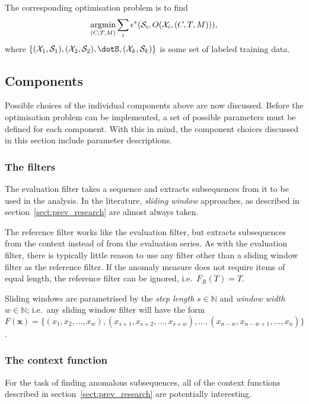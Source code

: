 The corresponding optimisation problem is to find
\[
    \argmin_{(C, T, M)} \sum_i \epsilon^*(\mathcal{S}_i, O(\mathcal{X}_i, (C, T, M))),
\]
where $\{(\mathcal{X}_1, \mathcal{S}_1), (\mathcal{X}_2, \mathcal{S}_2), \dotS, (\mathcal{X}_k, \mathcal{S}_k)\}$ is some set of labeled training data.

\subsection{Components}
\label{sect:components}

Possible choices of the individual components above are now discussed. Before the optimisation problem can be implemented, a set of possible parameters must be defined for each component. With this in mind, the component choices discussed in this section include parameter descriptions.

\subsubsection{The filters}

The evaluation filter takes a sequence and extracts subsequences from it to be used in the analysis. In the literature, \emph{sliding window} approaches, as described in section~\ref{sect:prev_research} are almost always taken.

The reference filter works like the evaluation filter, but extracts subsequences from the context instead of from the evaluation series. As with the evaluation filter, there is typically little reason to use any filter other than a sliding window filter as the reference filter. If the anomaly measure does not require items of equal length, the reference filter can be ignored, i.e.\ $F_R(T) = T$.

Sliding windows are parametrised by the \emph{step length} $s \in \mathbb{N}$ and \emph{window width} $w \in \mathbb{N}$; i.e.\ any sliding window filter will have the form $F(\mathbf{x}) = \{(x_1, x_2, \dots, x_w), (x_{s+1}, x_{s+2}, \dots, x_{s+w}), \dots, (x_{n-w}, x_{n-w+1}, \dots, x_{n})\}$.

\subsubsection{The context function}

For the task of finding anomalous subsequences, all of the context functions described in section~\ref{sect:prev_research} are potentially interesting.

